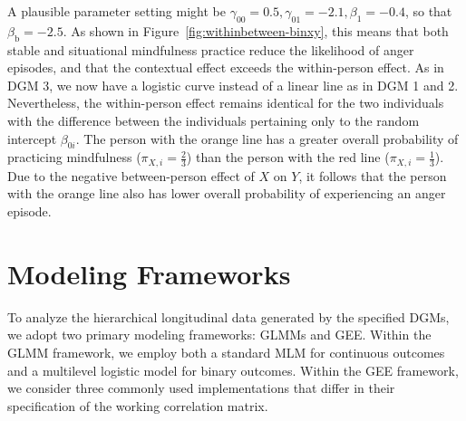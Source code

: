 A plausible parameter setting might be \( \gamma_{00} = 0.5, \gamma_{01} = -2.1, \beta_1 = -0.4 \), so that $\beta_\text{b} = -2.5$. As shown in Figure~\ref{fig:withinbetween-binxy}, this means that both stable and situational mindfulness practice reduce the likelihood of anger episodes, and that the contextual effect exceeds the within-person effect. 
As in DGM 3, we now have a logistic curve instead of a linear line as in DGM 1 and 2. Nevertheless, the within-person effect remains identical for the two individuals with the difference between the individuals pertaining only to the random intercept $\beta_{0i}$.  The person with the orange line has a greater overall probability of practicing mindfulness ($\pi_{X,i} = \frac{2}{3}$) than the person with the red line ($\pi_{X,i} = \frac{1}{3}$). Due to the negative between-person effect of $X$ on $Y$, it follows that the person with the orange line also has lower overall probability of experiencing an anger episode.

% 


\section{Modeling Frameworks}

To analyze the hierarchical longitudinal data generated by the specified DGMs, we adopt two primary modeling frameworks: GLMMs and GEE. Within the GLMM framework, we employ both a standard MLM for continuous outcomes and a multilevel logistic model for binary outcomes. Within the GEE framework, we consider three commonly used implementations that differ in their specification of the working correlation matrix.


